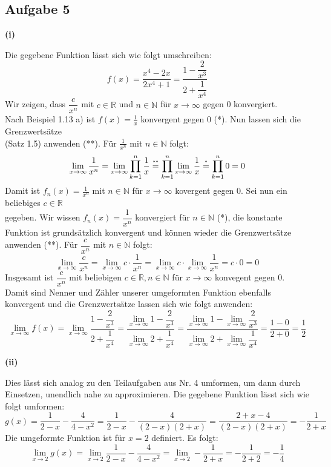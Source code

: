 \documentclass[a4paper,graphics,11pt]{article}
\newcommand{\aufgabe}[1]{\subsection*{Aufgabe #1}}
\newcommand{\up}[2]{\mathrel{\overset{\makebox[0pt]{\mbox{\normalfont\tiny #2}}}{#1}}}
\begin{document}
\newpage

\aufgabe{5}
\textbf{(i)}

Die gegebene Funktion lässt sich wie folgt umschreiben:
$$
    f(x) = \frac{x^4-2x}{2x^4+1} = \frac{1-\dfrac{2}{x^3}}{2+\dfrac{1}{x^4}}
$$
Wir zeigen, dass $\dfrac{c}{x^n}$ mit $c \in \mathbb{R}$ und $n\in \mathbb{N}$ für $x\to \infty$ gegen 0 konvergiert.\\
Nach Beispiel 1.13 a) ist $f(x) = \frac{1}{x}$ konvergent gegen 0 (*). Nun lassen sich
die Grenzwertsätze\\
(Satz 1.5) anwenden (**). Für $\frac{1}{x^n}$ mit $n \in \mathbb{N}$ folgt:
$$
    \lim_{x \to \infty} \frac{1}{x^n}
    = \lim_{x \to \infty} \prod_{k=1}^{n} \frac{1}{x}
    \up{=}{**} \prod_{k=1}^{n} \lim_{x \to \infty} \frac{1}{x}
    \up{=}{*} \prod_{k=1}^{n} 0 = 0
$$
Damit ist $f_n(x) = \frac{1}{x^n}$ mit $n \in \mathbb{N}$ für $x\to \infty$ kovergent gegen
0. Sei nun ein beliebiges $c \in \mathbb{R}$\\
gegeben. Wir wissen $f_n(x) = \dfrac{1}{x^n}$ konvergiert für
$n\in \mathbb{N}$ (*), die konstante Funktion ist grundsätzlich konvergent und können
wieder die Grenzwertsätze anwenden (**).
Für $\dfrac{c}{x^n}$ mit $n \in \mathbb{N}$ folgt:
$$
    \lim_{x \to \infty} \frac{c}{x^n}
    = \lim_{x \to \infty} c\cdot \frac{1}{x^n}
    = \lim_{x \to \infty} c \cdot \lim_{x \to \infty} \frac{1}{x^n}
    = c \cdot 0 = 0
$$
Insgesamt ist $\dfrac{c}{x^n}$ mit beliebigen $c \in \mathbb{R}, n \in \mathbb{N}$
für $x \to \infty$ konvegent gegen 0. Damit sind Nenner und Zähler unserer umgeformten
Funktion ebenfalls konvergent und die Grenzwertsätze lassen sich wie folgt anwenden:
$$
    \lim_{x \to \infty} f(x)
    = \lim_{x \to \infty} \frac{1-\dfrac{2}{x^3}}{2+\dfrac{1}{x^4}}
    = \frac{\lim_{x \to \infty}\limits 1 - \dfrac{2}{x^3}}{\lim_{x \to \infty}\limits 2+\dfrac{1}{x^4}} 
    = \frac{\lim_{x \to \infty}\limits 1 - \lim_{x \to \infty}\limits \dfrac{2}{x^3}}
        {\lim_{x \to \infty}\limits 2 + \lim_{x \to \infty}\limits \dfrac{1}{x^4}}
    = \frac{1-0}{2+0} = \frac{1}{2}
$$

\textbf{(ii)}

Dies lässt sich analog zu den Teilaufgaben aus Nr. 4 umformen, um dann durch Einsetzen,
unendlich nahe zu approximieren. Die gegebene Funktion lässt sich wie folgt umformen:
$$
    g(x) = \frac{1}{2-x} - \frac{4}{4-x^2}
    = \frac{1}{2-x} - \frac{4}{(2-x)(2+x)}
    = \frac{2+x-4}{(2-x)(2+x)}
    = -\frac{1}{2+x}
$$
Die umgeformte Funktion ist für $x=2$ definiert. Es folgt:
$$
    \lim_{x \to 2} g(x)
    = \lim_{x \to 2} \frac{1}{2-x} - \frac{4}{4-x^2}
    = \lim_{x \to 2} - \frac{1}{2+x}
    = - \frac{1}{2+2}
    = -\frac{1}{4}
$$
\end{document}

